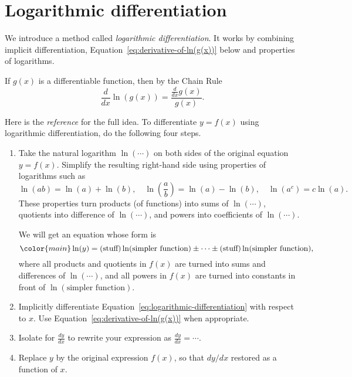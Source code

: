 \documentclass[../main.tex]{subfiles}
\begin{document}
 \section{Logarithmic differentiation}
We introduce a method called \emph{logarithmic differentiation}. It works by combining implicit differentiation, Equation~\eqref{eq:derivative-of-ln(g(x))} below and properties of logarithms.
\begin{mdframed}[style=withref]
  If \(g(x)\) is a differentiable function, then by the Chain Rule
  \begin{equation} \label{eq:derivative-of-ln(g(x))}
    \frac{d}{dx} \ln( g(x) ) = \frac{\frac{d}{dx}g(x)}{g(x)}.
  \end{equation}

\end{mdframed}


Here is the \emph{reference} for the full idea. To differentiate \(y = f(x)\) using logarithmic differentiation, do the following four steps.
\begin{enumerate}
  \item Take the natural logarithm \(\ln(\cdots{})\) on both sides of the original equation \(y = f(x)\). Simplify the resulting right-hand side using properties of logarithms such as 
    \[
      \ln(ab) = \ln(a) + \ln(b), \quad \ln\left(\frac{a}{b}\right) = \ln(a) - \ln(b), \quad \ln(a^{c}) = c \ln(a). 
    \]
    These properties turn products (of functions) into sums of \(\ln(\cdots)\), quotients into difference of \(\ln(\cdots)\), and powers into coefficients of \(\ln(\cdots)\).

    We will get an equation whose form is 
    \begin{equation} \label{eq:logarithmic-differentiation}
      \color{main}
      \ln(y) = (\text{stuff})\ln( \text{simpler function} ) \pm \cdots \pm (\text{stuff})\ln( \text{simpler function} ),
    \end{equation}
    where all products and quotients in \(f(x)\) are turned into sums and differences of \(\ln(\cdots)\), and all powers in \(f(x)\) are turned into constants in front of \(\ln(\text{simpler function})\).


  \item Implicitly differentiate Equation~\eqref{eq:logarithmic-differentiation} with respect to \(x\). Use Equation~\eqref{eq:derivative-of-ln(g(x))} when appropriate.

  \item Isolate for \(\frac{dy}{dx}\) to rewrite your expression as \(\frac{dy}{dx} = \cdots\). 
  \item Replace \(y\) by the original expression \(f(x)\), so that \(dy/dx\) restored as a function of \(x\).
\end{enumerate}
\clearpage
\end{document}
